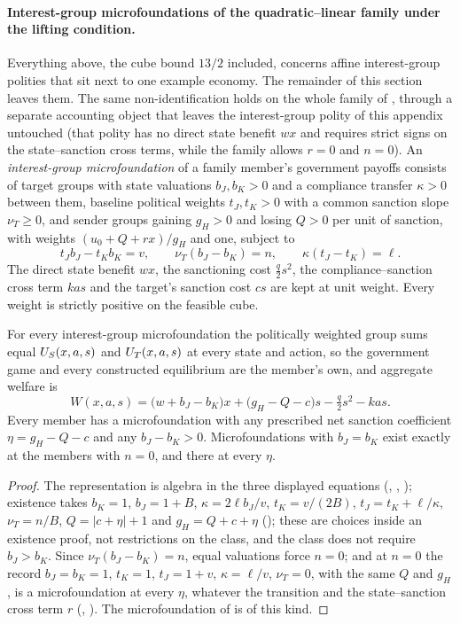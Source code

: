 \paragraph{Interest-group microfoundations of the quadratic--linear family under the lifting condition.}
Everything above, the cube bound $13/2$ included, concerns affine interest-group
polities that sit next to one example economy. The remainder of this
section leaves them. The same non-identification holds on the whole family of
, through a separate accounting object that leaves the
interest-group polity of this appendix untouched (that polity has no direct
state benefit $wx$ and requires strict signs on the state--sanction cross terms, while the family allows
$r=0$ and $n=0$). An \emph{interest-group microfoundation} of a family member's government payoffs consists of
target groups with state valuations $b_J,b_K>0$ and a compliance transfer
$\kappa>0$ between them, baseline political weights $t_J,t_K>0$ with a common
sanction slope $\nu_T\ge0$, and sender groups gaining $g_H>0$ and losing $Q>0$
per unit of sanction, with weights $(u_0+Q+rx)/g_H$ and one, subject to
\[
t_Jb_J-t_Kb_K=v,\qquad \nu_T(b_J-b_K)=n,\qquad \kappa(t_J-t_K)=\ell .
\]
The direct state benefit $wx$, the sanctioning cost $\tfrac q2s^2$, the
compliance--sanction cross term $kas$ and the target's sanction cost $cs$ are kept at unit
weight. Every weight is strictly positive on the feasible cube.

\begin{lemma}
\label{lem:welfare-completion}
For every interest-group microfoundation the politically weighted group sums equal
$U_S(x,a,s)$ and $U_T(x,a,s)$ at every state and action, so the government
game and every constructed equilibrium are the member's own, and aggregate
welfare is
\[
W(x,a,s)=\bigl(w+b_J-b_K\bigr)x+\bigl(g_H-Q-c\bigr)s-\tfrac q2s^2-kas .
\]
Every member has a microfoundation with any prescribed net sanction coefficient
$\eta=g_H-Q-c$ and any $b_J-b_K>0$. Microfoundations with $b_J=b_K$ exist exactly
at the members with $n=0$, and there at every $\eta$.
\end{lemma}

\begin{proof}
The representation is algebra in the three displayed equations
(, , ); existence takes $b_K=1$,
$b_J=1+B$, $\kappa=2\ell b_J/v$, $t_K=v/(2B)$, $t_J=t_K+\ell/\kappa$,
$\nu_T=n/B$, $Q=|c+\eta|+1$ and $g_H=Q+c+\eta$
(); these are choices inside an existence
proof, not restrictions on the class, and the class does not require
$b_J>b_K$. Since $\nu_T(b_J-b_K)=n$, equal valuations force $n=0$; and at
$n=0$ the record $b_J=b_K=1$, $t_K=1$, $t_J=1+v$, $\kappa=\ell/v$, $\nu_T=0$,
with the same $Q$ and $g_H$, is a microfoundation at every $\eta$, whatever the
transition and the state--sanction cross term $r$ (,
). The microfoundation of
 is of this kind.
\end{proof}

